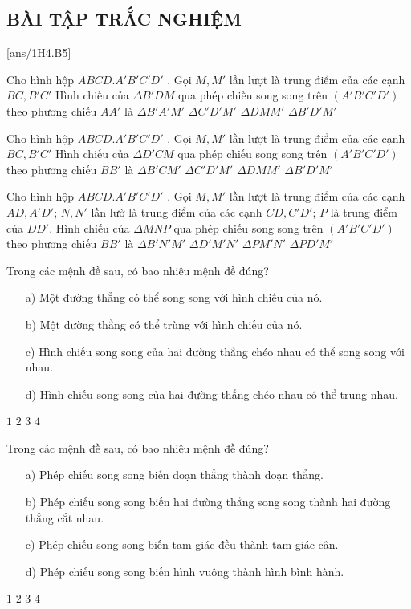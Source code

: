 
\subsection{BÀI TẬP TRẮC NGHIỆM}

[ans/1H4.B5]
\setcounter{ex}{0}
\begin{ex}
	Cho hình hộp $ABCD.A'B'C'D'$  . Gọi $M, M'$   lần lượt là trung điểm của các cạnh $BC, B'C'$  Hình chiếu của $\Delta B'DM$  qua phép chiếu song song trên $(A'B'C'D')$  theo phương chiếu $AA'$   là
	\choice
	{$\Delta B'A'M'$}
		{$\Delta C'D'M'$}
			{$\Delta DMM'$}
				{\True$\Delta B'D'M'$}
\end{ex}
\begin{ex}
		Cho hình hộp $ABCD.A'B'C'D'$  . Gọi $M, M'$   lần lượt là trung điểm của các cạnh $BC, B'C'$  Hình chiếu của $\Delta D'CM$  qua phép chiếu song song trên $(A'B'C'D')$  theo phương chiếu $BB'$   là
	\choice
	{$\Delta B'CM'$}
	{\True$\Delta C'D'M'$}
	{$\Delta DMM'$}
	{$\Delta B'D'M'$}
\end{ex}
\begin{ex}
	Cho hình hộp $ABCD.A'B'C'D'$  . Gọi $M, M'$   lần lượt là trung điểm của các cạnh $AD, A'D'$; $N, N'$ lần lườ là trung điểm của các cạnh $CD, C'D'$; $P$ là trung điểm của $DD'$.  Hình chiếu của $\Delta MNP$  qua phép chiếu song song trên $(A'B'C'D')$  theo phương chiếu $BB'$   là
	\choice
	{$\Delta B'N'M'$}
	{\True$\Delta D'M'N'$}
	{$\Delta PM'N'$}
	{$\Delta PD'M'$}
\end{ex}
\begin{ex}
	Trong các mệnh đề sau, có bao nhiêu mệnh đề đúng?
	\begin{itemize}
		\item [a)] Một đường thẳng có thể song song với hình chiếu của nó.
		\item [b)] Một đường thẳng có thể trùng với hình chiếu của nó.
		\item [c)] Hình chiếu song song của hai đường thẳng chéo nhau có thể song song với nhau.
		\item [d)]Hình chiếu song song của hai đường thẳng chéo nhau có thể trung nhau.
	\end{itemize}
\choice
{$1$}
{$2$}
{$3$}
{$4$}
\end{ex}
\begin{ex}
	Trong các mệnh đề sau, có bao nhiêu mệnh đề đúng?
	\begin{itemize}
		\item [a)] Phép chiếu song song biến đoạn thẳng thành đoạn thẳng.
		\item [b)] Phép chiếu song song biến hai đường thẳng song song thành hai đường thẳng cắt nhau.
		\item [c)] Phép chiếu song song biến tam giác đều thành tam giác cân.
		\item [d)] Phép chiếu song song biến hình vuông thành hình bình hành.
	\end{itemize}
	\choice
	{$1$}
	{$2$}
	{$3$}
	{$4$}
\end{ex}

